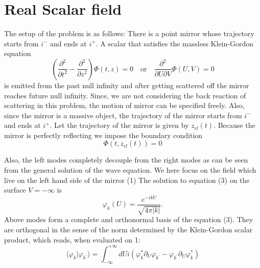 \section{Real Scalar field}
The setup of the problem is as follows: There is a point mirror whose trajectory starts from $i^{-}$ and ends at $i^{+}$. A scalar that satisfies the massless Klein-Gordon equation 
\begin{equation}
\left(\frac{\partial^{2}}{\partial t^{2}}-\frac{\partial^{2}}{\partial z^{2}}\right)\Phi(t,z)=0 \quad \text{or} \quad \frac{\partial^{2}}{\partial U\partial V}\Phi(U,V)=0
\end{equation}
is emitted from the past null infinity and after getting scattered off the mirror reaches future null infinity. Since, we are not considering the back reaction of scattering in this problem, the motion of mirror can be specified freely. Also, since the mirror is a massive object, the trajectory of the mirror starts from $i^{-}$ and ends at $i^{+}$. Let the trajectory of the mirror is given by $z_{cl}(t)$. Because the mirror is perfectly reflecting we impose the boundary condition 
\begin{equation}
\Phi(t,z_{cl}(t))=0
\end{equation}

Also, the left modes completely decouple from the right modes as can be seen from the general solution of the wave equation. We here focus on the field which live on the left hand side of the mirror (1) The solution to equation (3) on the surface $V=-\infty$ is 
\begin{equation}
\varphi_{k}(U)=\frac{e^{-ikU}}{\sqrt{4\pi|k|}}.
\end{equation}
Above modes form a complete and orthonormal basis of the equation (3). They are orthogonal in the sense of the norm determined by the Klein-Gordon scalar product, which reads, when evaluated on 1: 
\begin{equation}
\langle\varphi_{k}|\varphi_{k^{\prime}}\rangle=\int_{-\infty}^{+\infty}dUi(\varphi_{k}^{*}\partial_{U}\varphi_{k^{\prime}}-\varphi_{k^{\prime}}\partial_{U}\varphi_{k}^{*})
\end{equation}

